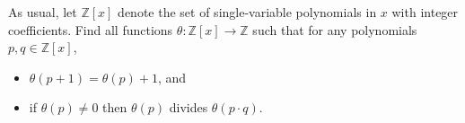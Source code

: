 As usual, let $\mathbb{Z}\left[x\right]$ denote the set of single-variable polynomials in $x$ with integer coefficients. Find all functions $\theta:\mathbb{Z}\left[x\right]\to\mathbb{Z}$ such that for any polynomials $p,q\in\mathbb{Z}\left[x\right]$,

\begin{itemize}
	\item $\theta\left(p+1\right)=\theta\left(p\right)+1$, and
	\item if $\theta\left(p\right)\neq0$ then $\theta\left(p\right)$ divides $\theta\left(p\cdot q\right)$.
\end{itemize}